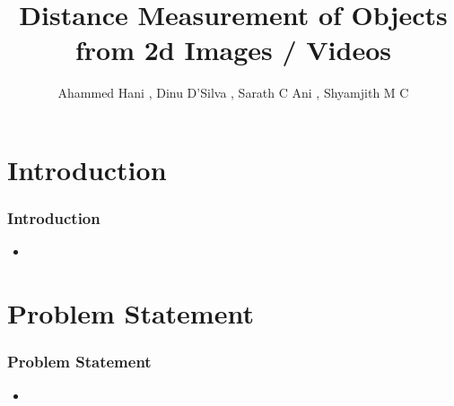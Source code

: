 \documentclass{beamer}
\title{Distance Measurement of Objects from 2d Images / Videos}
\author{Ahammed Hani , Dinu D'Silva , Sarath C Ani , Shyamjith M C}
\begin{document}
	
	\maketitle
	
	\section{Introduction}
	\begin{frame}
	\frametitle{Introduction}
	
	\begin{itemize}
		\item 
	\end{itemize}
	
	\end{frame}
	
	
	\section{Problem Statement}
	\begin{frame}
	\frametitle{Problem Statement}
	
	\begin{itemize}
		\item 
	\end{itemize}
	
	\end{frame}
\end{document}
